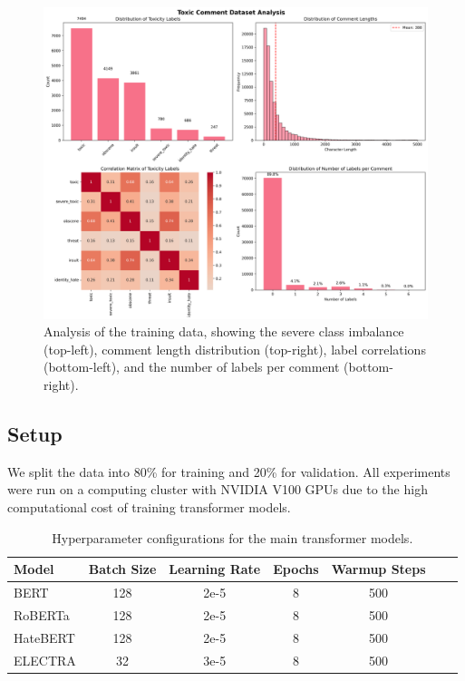 \documentclass[11pt]{article}
\begin{document}
\begin{figure}[ht]
    \centering
    \includegraphics[width=\textwidth]{dataset_analysis.png}
    \caption{Analysis of the training data, showing the severe class imbalance (top-left), comment length distribution (top-right), label correlations (bottom-left), and the number of labels per comment (bottom-right).}
    \label{fig:data_analysis}
\end{figure}

\subsection{Setup}
We split the data into 80\% for training and 20\% for validation. All experiments were run on a computing cluster with NVIDIA V100 GPUs due to the high computational cost of training transformer models.

\begin{table}[ht]
\centering
\small
\begin{tabular}{lcccccc}
\toprule
\textbf{Model} & \textbf{Batch Size} & \textbf{Learning Rate} & \textbf{Epochs} & \textbf{Warmup Steps} \\
\midrule
BERT & 128 & 2e-5 & 8 & 500 \\
RoBERTa & 128 & 2e-5 & 8 & 500 \\
HateBERT & 128 & 2e-5 & 8 & 500 \\
ELECTRA & 32 & 3e-5 & 8 & 500 \\
\bottomrule
\end{tabular}
\caption{Hyperparameter configurations for the main transformer models.}
\label{tab:hyperparams_detailed}
\end{table}
\end{document}
